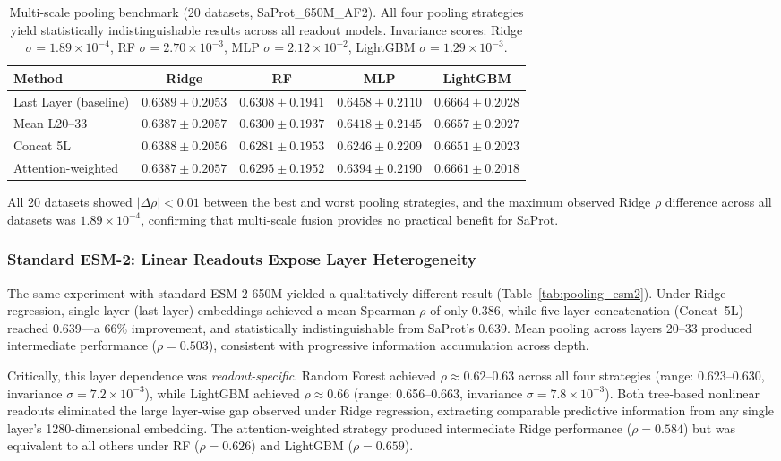 \documentclass[11pt,a4paper]{article}
\begin{document}
\begin{table}[ht]
\centering
\caption{Multi-scale pooling benchmark (20 datasets, SaProt\_650M\_AF2). All four pooling strategies
yield statistically indistinguishable results across all readout models.
Invariance scores: Ridge $\sigma = 1.89 \times 10^{-4}$, RF $\sigma = 2.70 \times 10^{-3}$,
MLP $\sigma = 2.12 \times 10^{-2}$, LightGBM $\sigma = 1.29 \times 10^{-3}$.}
\label{tab:pooling}
\begin{tabular}{lcccc}
\toprule
Method & Ridge & RF & MLP & LightGBM \\
\midrule
Last Layer (baseline) & $0.6389 \pm 0.2053$ & $0.6308 \pm 0.1941$ & $0.6458 \pm 0.2110$ & $0.6664 \pm 0.2028$ \\
Mean L20--33          & $0.6387 \pm 0.2057$ & $0.6300 \pm 0.1937$ & $0.6418 \pm 0.2145$ & $0.6657 \pm 0.2027$ \\
Concat 5L             & $0.6388 \pm 0.2056$ & $0.6281 \pm 0.1953$ & $0.6246 \pm 0.2209$ & $0.6651 \pm 0.2023$ \\
Attention-weighted    & $0.6387 \pm 0.2057$ & $0.6295 \pm 0.1952$ & $0.6394 \pm 0.2190$ & $0.6661 \pm 0.2018$ \\
\bottomrule
\end{tabular}
\end{table}

All 20 datasets showed $|\Delta\rho| < 0.01$ between the best and worst pooling
strategies, and the maximum observed Ridge $\rho$ difference across all
datasets was $1.89 \times 10^{-4}$, confirming that multi-scale fusion
provides no practical benefit for SaProt.

\subsubsection{Standard ESM-2: Linear Readouts Expose Layer Heterogeneity}

The same experiment with standard ESM-2 650M yielded a qualitatively different
result (Table~\ref{tab:pooling_esm2}). Under Ridge regression, single-layer
(last-layer) embeddings achieved a mean Spearman $\rho$ of only 0.386, while
five-layer concatenation (Concat~5L) reached 0.639---a 66\% improvement, and
statistically indistinguishable from SaProt's 0.639. Mean pooling across layers
20--33 produced intermediate performance ($\rho = 0.503$), consistent with
progressive information accumulation across depth.

Critically, this layer dependence was \emph{readout-specific}. Random Forest
achieved $\rho \approx 0.62$--$0.63$ across all four strategies (range:
0.623--0.630, invariance $\sigma = 7.2 \times 10^{-3}$), while LightGBM
achieved $\rho \approx 0.66$ (range: 0.656--0.663, invariance $\sigma = 7.8
\times 10^{-3}$). Both tree-based nonlinear readouts eliminated the large
layer-wise gap observed under Ridge regression, extracting comparable predictive
information from any single layer's 1280-dimensional embedding. The
attention-weighted strategy produced intermediate Ridge performance
($\rho = 0.584$) but was equivalent to all others under RF ($\rho = 0.626$)
and LightGBM ($\rho = 0.659$).
\end{document}
